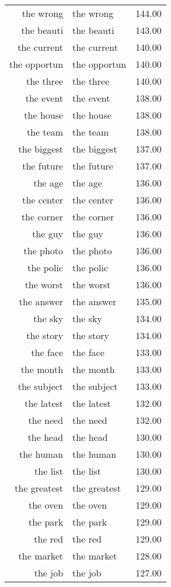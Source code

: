 \begin{table}[ht]
\begin{tabular}{rlr}
  the wrong & the wrong & 144.00 \\ 
  the beauti & the beauti & 143.00 \\ 
  the current & the current & 140.00 \\ 
  the opportun & the opportun & 140.00 \\ 
  the three & the three & 140.00 \\ 
  the event & the event & 138.00 \\ 
  the house & the house & 138.00 \\ 
  the team & the team & 138.00 \\ 
  the biggest & the biggest & 137.00 \\ 
  the future & the future & 137.00 \\ 
  the age & the age & 136.00 \\ 
  the center & the center & 136.00 \\ 
  the corner & the corner & 136.00 \\ 
  the guy & the guy & 136.00 \\ 
  the photo & the photo & 136.00 \\ 
  the polic & the polic & 136.00 \\ 
  the worst & the worst & 136.00 \\ 
  the answer & the answer & 135.00 \\ 
  the sky & the sky & 134.00 \\ 
  the story & the story & 134.00 \\ 
  the face & the face & 133.00 \\ 
  the month & the month & 133.00 \\ 
  the subject & the subject & 133.00 \\ 
  the latest & the latest & 132.00 \\ 
  the need & the need & 132.00 \\ 
  the head & the head & 130.00 \\ 
  the human & the human & 130.00 \\ 
  the list & the list & 130.00 \\ 
  the greatest & the greatest & 129.00 \\ 
  the oven & the oven & 129.00 \\ 
  the park & the park & 129.00 \\ 
  the red & the red & 129.00 \\ 
  the market & the market & 128.00 \\ 
  the job & the job & 127.00 \\ 

\end{tabular}
\end{table}
